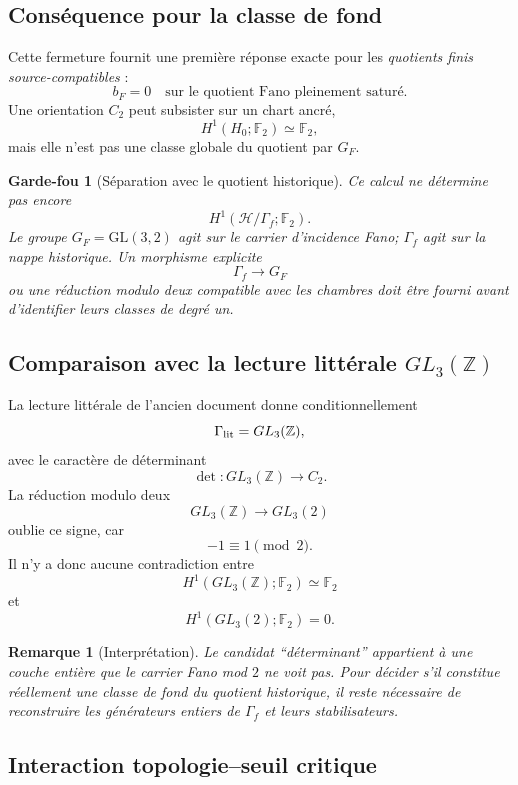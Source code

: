 \documentclass[11pt,a4paper]{article}
\newtheorem{remark}[theorem]{Remarque}
\newtheorem{guardrail}[theorem]{Garde-fou}
\begin{document}
\subsection{Conséquence pour la classe de fond}

Cette fermeture fournit une première réponse exacte pour les \emph{quotients finis source-compatibles} :
\[
 \boxed{
 b_F=0
 \quad\text{sur le quotient Fano pleinement saturé}.}
\]
Une orientation $C_2$ peut subsister sur un chart ancré,
\[
 H^1(H_0;\mathbb F_2)\simeq\mathbb F_2,
\]
mais elle n'est pas une classe globale du quotient par $G_F$.

\begin{guardrail}[Séparation avec le quotient historique]
Ce calcul ne détermine pas encore
\[
 H^1(\mathcal H/\Gamma_f;\mathbb F_2).
\]
Le groupe $G_F=\mathrm{GL}(3,2)$ agit sur le carrier d'incidence Fano; $\Gamma_f$ agit sur la nappe historique. Un morphisme explicite
\[
 \Gamma_f\longrightarrow G_F
\]
ou une réduction modulo deux compatible avec les chambres doit être fourni avant d'identifier leurs classes de degré un.
\end{guardrail}

\subsection{Comparaison avec la lecture littérale \texorpdfstring{$GL_3(\mathbb Z)$}{GL3Z}}

La lecture littérale de l'ancien document donne conditionnellement
\[
 \Gamma_{\rm lit}=GL_3(\mathbb Z),
\]
avec le caractère de déterminant
\[
 \det:GL_3(\mathbb Z)\to C_2.
\]
La réduction modulo deux
\[
 GL_3(\mathbb Z)\longrightarrow GL_3(2)
\]
oublie ce signe, car
\[
 -1\equiv1\pmod2.
\]
Il n'y a donc aucune contradiction entre
\[
 H^1(GL_3(\mathbb Z);\mathbb F_2)\simeq\mathbb F_2
\]
et
\[
 H^1(GL_3(2);\mathbb F_2)=0.
\]

\begin{remark}[Interprétation]
Le candidat ``déterminant'' appartient à une couche entière que le carrier Fano mod $2$ ne voit pas. Pour décider s'il constitue réellement une classe de fond du quotient historique, il reste nécessaire de reconstruire les générateurs entiers de $\Gamma_f$ et leurs stabilisateurs.
\end{remark}

\subsection{Interaction topologie--seuil critique}
\end{document}
